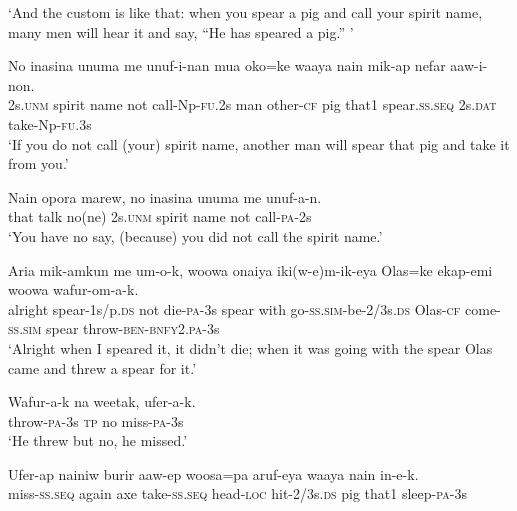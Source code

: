 {\glt ‘And the custom is like that: when you spear a pig and call your spirit name, many men will hear it and say,  “He has speared a pig.” ’ \\
\z


\ea\label{ex:a:x18}
\gll  No  inasina  unuma  me  unuf-i-nan  mua  oko=ke  waaya  nain    mik-ap  nefar  aaw-i-non. \\
2s.\textsc{unm}  spirit  name  not  call-Np-\textsc{fu}.2s  man  other-\textsc{cf}  pig  that1   spear.\textsc{ss.seq}  2s.\textsc{dat}  take-Np-\textsc{fu}.3s \\


\glt ‘If you do not call (your) spirit name, another man will spear that pig and take it from you.’ \\
\z


\ea\label{ex:a:x19}
\gll  Nain  opora  marew,  no  inasina  unuma  me  unuf-a-n. \\
that  talk  no(ne)  2s.\textsc{unm}  spirit  name  not  call-\textsc{pa}-2s \\
\glt ‘You have no say, (because) you did not call the spirit name.’ \\
\z


\ea\label{ex:a:x20}
\gll  Aria  mik-amkun  me  um-o-k,  woowa  onaiya  iki(w-e)m-ik-eya       Olas=ke  ekap-emi  woowa  wafur-om-a-k. \\
alright  spear-1s/p.\textsc{ds}  not  die-\textsc{pa}-3s  spear  with  go-\textsc{ss}.\textsc{sim}-be-2/3s.\textsc{ds} Olas-\textsc{cf}  come-\textsc{ss}.\textsc{sim}  spear  throw-\textsc{ben}-\textsc{bnfy}2.\textsc{pa}-3s \\


\glt ‘Alright when I speared it, it didn’t die; when it was going with the spear Olas came and threw a spear for it.’ \\
\z


\ea\label{ex:a:x21}
\gll  Wafur-a-k  na  weetak,  ufer-a-k. \\
throw-\textsc{pa}-3s  \textsc{tp}  no  miss-\textsc{pa}-3s \\
\glt ‘He threw but no, he missed.’ \\
\z


\ea\label{ex:a:x22}
\gll  Ufer-ap  nainiw  burir  aaw-ep  woosa=pa  aruf-eya      waaya  nain  in-e-k. \\
miss-\textsc{ss.seq}  again  axe  take-\textsc{ss.seq}  head-\textsc{loc}  hit-2/3s.\textsc{ds}   pig  that1  sleep-\textsc{pa}-3s \\


}
